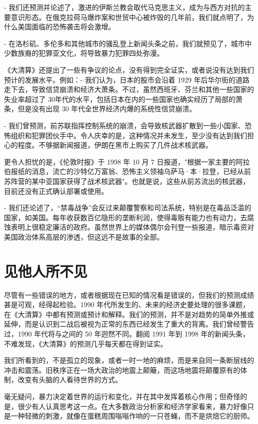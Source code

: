 - 我们还预测并论述了，激进的伊斯兰教会取代马克思主义，成为与西方对抗的主要意识形态。在俄克拉荷马爆炸案和世贸中心被炸毁的几年前，我们就点明了，为什么美国面临的恐怖袭击将会激增。


- 在洛杉矶、多伦多和其他城市的骚乱登上新闻头条之前，我们就预见了，城市中少数族裔的犯罪亚文化，将导致暴力犯罪四处弥漫。



《大清算》还提出了一些有争议的论点，没有得到完全证实，或者说没有达到我们预计的发展水平。例如：- 我们认为，日本的股市会沿着 1929 年后华尔街的道路走下去，导致信贷崩溃和经济大萧条。不过，虽然西班牙、芬兰和其他一些国家的失业率超过了 30年代的水平，包括日本在内的一些国家也确实经历了局部的萧条，但是没有出现 30 年代全世界经济内爆的系统性信贷崩溃。


- 我们曾预测，前苏联指挥控制系统的崩溃，会导致核武器扩散到一些小国家、恐怖组织和犯罪团伙手中。令人庆幸的是，这种情况并未发生，至少没有达到我们担心的程度。不够据新闻报道，伊朗在黑市上购买了几件战术核武器。


更令人担忧的是，《伦敦时报》于 1998 年 10 月 7 日报道，"根据一家主要的阿拉伯报纸的消息，流亡的沙特亿万富翁、恐怖主义领袖乌萨马·本·拉登，已经从前苏阵营的某中亚国家获得了战术核武器"。也就是说，这些从前苏流出的核武器，目前还没有正式确认部署或使用。


- 我们还论述了，“禁毒战争”会反过来颠覆警察和司法系统，特别是在毒品泛滥的国家，如美国。每年收获数百亿隐形的垄断利润，使得毒贩有能力也有动力，去腐蚀表明上很稳定廉洁的政府。虽然世界上的媒体偶尔会刊登一些报道，暗示毒资对美国政治体系高层的渗透，但这远不是故事的全部。


\section{见他人所不见}
尽管有一些错误的地方，或者根据现在已知的情况看是错误的，但我们的预测成绩甚是可观，经得起检验。1990 年代所发生的、未来的经济史要处理的很多课题，在《大清算》中都有预测或预计和解释。我们的预测，并不是对趋势的简单外推或延伸，而是认识到二战后被视为正常的东西已经发生了重大的背离。我们曾经警告过，1990 年代将与之间的 50 年迥然不同。翻阅 1991 年到 1998 年的新闻头条，不难发现，《大清算》的预测几乎每天都在得到证实。


我们所看到的，不是孤立的现象，或者一时一地的麻烦，而是来自同一条断层线的冲击和震荡。旧秩序正在一场大政治的地震上颠簸，而这场地震将颠覆原有的体制，改变有头脑的人看待世界的方式。


毫无疑问，暴力决定着世界的运行和变化，并在其中发挥着核心作用；但奇怪的是，很少有人认真思考这一点。在大多数政治分析家和经济学家看来，暴力好像只是一种轻微的刺激，就像在蛋糕周围嗡嗡作响的一只苍蝇，而不是烘焙它的厨师。


